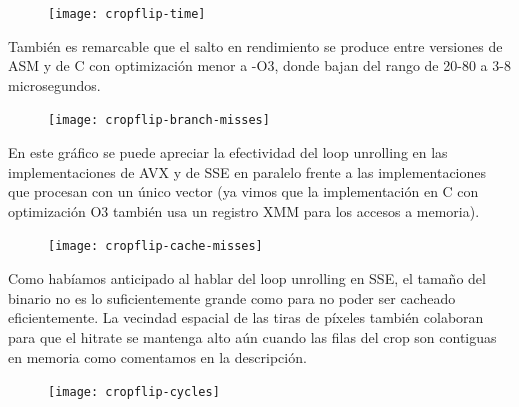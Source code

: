 \begin{figure}[h]
\centering
\texttt{[image: cropflip-time]}
\label{fig:cropflip-time}
\end{figure}

También es remarcable que el salto en rendimiento se produce entre versiones de ASM y de C con optimización menor a -O3, donde bajan del rango de 20-80 a 3-8 microsegundos.

\begin{figure}[h]
\centering
\texttt{[image: cropflip-branch-misses]}
\label{fig:cropflip-branch-misses}
\end{figure}


En este gráfico se puede apreciar la efectividad del loop unrolling en las implementaciones de AVX y de SSE en paralelo frente a las implementaciones que procesan con un único vector (ya vimos que la implementación en C con optimización O3 también usa un registro XMM para los accesos a memoria).

\begin{figure}[h]
\centering
\texttt{[image: cropflip-cache-misses]}
\label{fig:cropflip-cache-misses}
\end{figure}

Como habíamos anticipado al hablar del loop unrolling en SSE, el tamaño del binario no es lo suficientemente grande como para no poder ser cacheado eficientemente. La vecindad espacial de las tiras de píxeles también colaboran para que el hitrate se mantenga alto aún cuando las filas del crop son contiguas en memoria como comentamos en la descripción.

\begin{figure}[h]
\centering
\texttt{[image: cropflip-cycles]}
\label{fig:cropflip-cycles}
\end{figure}




	
